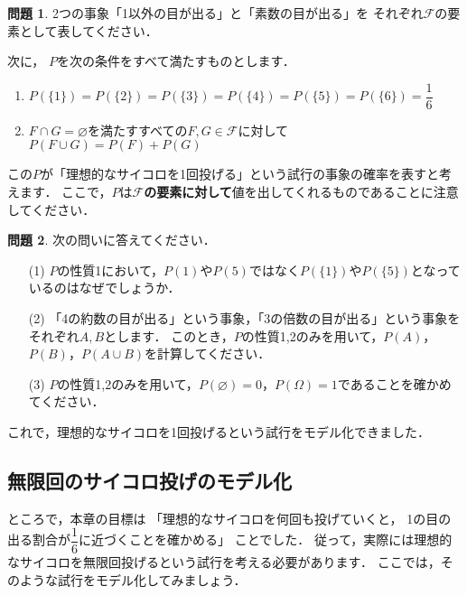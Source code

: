 \documentclass[./main]{subfiles} %
\theoremstyle{definition}
\newtheorem{hamadadefi}{定義}[section]
\newtheorem{hamadaqst}[hamadadefi]{問題}
\begin{document}
\begin{hamadaqst}\label{checkofF}
2つの事象「1以外の目が出る」と「素数の目が出る」を
それぞれ$\mathcal{F}$の要素として表してください．
\end{hamadaqst}

次に，
$P$を次の条件をすべて満たすものとします．
\begin{enumerate}
\item $P(\{1\})=P(\{2\})=P(\{3\})=P(\{4\})=P(\{5\})=P(\{6\})=\dfrac{1}{6}$
\item $F\cap G=\varnothing$を満たすすべての$F,G\in\mathcal{F}$に対して
$P(F\cup G)=P(F)+P(G)$
\end{enumerate}
この$P$が「理想的なサイコロを1回投げる」という試行の事象の確率を表すと考えます．
ここで，$P$は\textbf{$\mathcal{F}$の要素に対して}値を出してくれるものであることに注意してください．

\begin{hamadaqst}\label{checkofP}
次の問いに答えてください．
\begin{itemize}
\item[(1)]$P$の性質1において，$P(1)$や$P(5)$ではなく$P(\{1\})$や$P(\{5\})$となっているのはなぜでしょうか．
\item[(2)]「4の約数の目が出る」という事象，「3の倍数の目が出る」という事象をそれぞれ$A,B$とします．
このとき，$P$の性質1,2のみを用いて，$P(A)$，$P(B)$，$P(A\cup B)$を計算してください．
\item[(3)]$P$の性質1,2のみを用いて，$P(\varnothing)=0$，$P(\Omega)=1$であることを確かめてください．
\end{itemize}
\end{hamadaqst}

これで，理想的なサイコロを1回投げるという試行をモデル化できました．


\subsection{無限回のサイコロ投げのモデル化}\label{subsec:infiniteprobsp}

ところで，本章の目標は
「理想的なサイコロを何回も投げていくと，
1の目の出る割合が$\dfrac{1}{6}$に近づくことを確かめる」
ことでした．
従って，実際には理想的なサイコロを無限回投げるという試行を考える必要があります．
ここでは，そのような試行をモデル化してみましょう．
\end{document}
